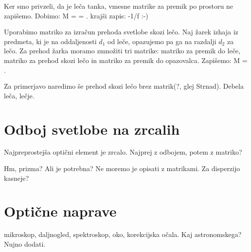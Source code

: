 Ker smo privzeli, da je leča tanka, vmesne matrike za premik po prostoru 
ne zapišemo. Dobimo:
\beq
 M = \cdot 
{} = 
\!\!.
\label{eq:02_47}
\eeq
krajši zapis: -1/f :-)

Uporabimo matriko za izračun prehoda svetlobe skozi lečo. Naj žarek izhaja iz 
predmeta, ki je na oddaljenosti $d_1$ od leče, opazujemo pa ga na razdalji
$d_2$ za lečo. Za prehod žarka moramo zmnožiti tri matrike: matriko za 
premik do leče, matriko za prehod skozi lečo in matriko za premik do opazovalca.
Zapišemo:
\beq
M = 
\left[\begin{array}{cc}
1& d_2\\
0&1
\end{array}\right]\cdot
{}
\cdot
\left[\begin{array}{cc}
1& d_1\\
0&1
\end{array}\right]\!\!.
\label{eq:02_48}
\eeq





Za primerjavo naredimo še prehod skozi lečo brez matrik(?, glej Strnad). 
Debela leča, lečje. 

\section{Odboj svetlobe na zrcalih}


Najpreprostejša optični element je zrcalo. Najprej z odbojem, potem z matriko?

Hm, prizma? Ali je potrebna? Ne moremo je opisati z matrikami. Za disperzijo kasneje?

\section{Optične naprave}

mikroskop, daljnogled, spektroskop, oko, korekcijska očala. Kaj astronomskega? Nujno dodati.


